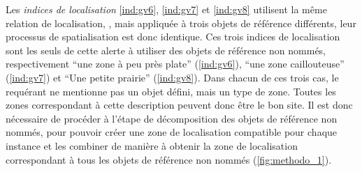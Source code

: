 Les \emph{indices de localisation} \ref{ind:gv6}, \ref{ind:gv7} et
\ref{ind:gv8} utilisent la même relation de localisation,
, mais appliquée à trois objets de
référence différents, leur processus de spatialisation est donc
identique. Ces trois indices de localisation sont les seuls de cette
alerte à utiliser des objets de référence non nommés, respectivement
\enquote{une zone à peu près plate} (\ref{ind:gv6}), \enquote{une zone
  caillouteuse} (\ref{ind:gv7}) et \enquote{Une petite prairie}
(\ref{ind:gv8}). Dans chacun de ces trois cas, le requérant ne
mentionne pas un objet défini, mais un type de zone. Toutes les zones
correspondant à cette description peuvent donc être le bon site. Il
est donc nécessaire de procéder à l'étape de décomposition des objets
de référence non nommés, pour pouvoir créer une zone de localisation
compatible pour chaque instance et les combiner de manière à obtenir
la zone de localisation correspondant à tous les objets de référence
non nommés (\autoref{fig:methodo_1}).

